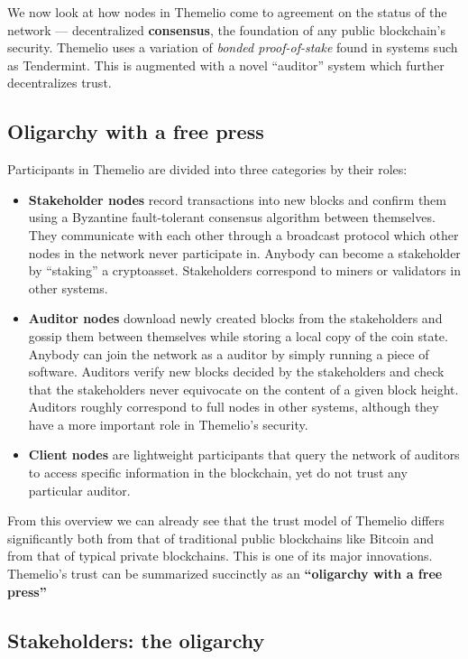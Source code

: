 \documentclass[headinclude]{scrbook}
\begin{document}
We now look at how nodes in Themelio come to agreement on the status of the network --- decentralized \textbf{consensus}, the foundation of any public blockchain's security. Themelio uses a variation of \emph{bonded proof-of-stake} found in systems such as Tendermint. This is augmented with a novel ``auditor'' system which further decentralizes trust.

\subsection{Oligarchy with a free press}

Participants in Themelio are divided into three categories by their roles:

\begin{itemize}
    \item \textbf{Stakeholder nodes} record transactions into new blocks and confirm them using a Byzantine fault-tolerant consensus algorithm between themselves. They communicate with each other through a broadcast protocol which other nodes in the network never participate in. Anybody can become a stakeholder by ``staking'' a cryptoasset. Stakeholders correspond to miners or validators in other systems.
    \item \textbf{Auditor nodes} download newly created blocks from the stakeholders and gossip them between themselves while storing a local copy of the coin state. Anybody can join the network as a auditor by simply running a piece of software. Auditors verify new blocks decided by the stakeholders and check that the stakeholders never equivocate on the content of a given block height. Auditors roughly correspond to full nodes in other systems, although they have a more important role in Themelio's security.
    \item \textbf{Client nodes} are lightweight participants that query the network of auditors to access specific information in the blockchain, yet do not trust any particular auditor.
\end{itemize}

From this overview we can already see that the trust model of Themelio differs significantly both from that of traditional public blockchains like Bitcoin and from that of typical private blockchains. This is one of its major innovations. Themelio's trust can be summarized succinctly as an \textbf{``oligarchy with a free press''}

\subsection{Stakeholders: the oligarchy}
\end{document}
